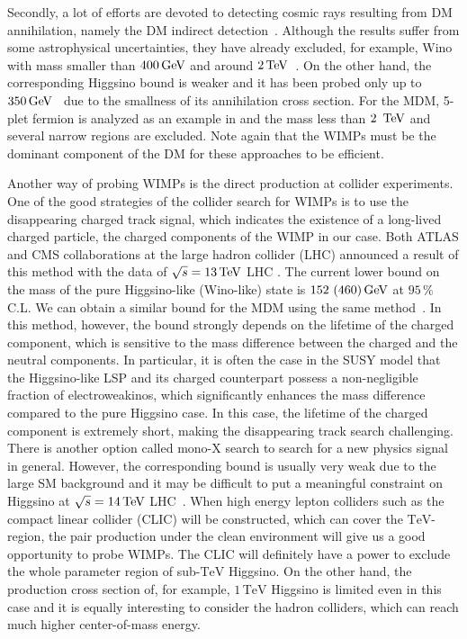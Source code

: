 \documentclass[12pt,twoside,book]{article}
\begin{document}
Secondly, a lot of efforts are devoted to detecting cosmic rays resulting from DM annihilation, namely the DM indirect detection~\cite{Fermi-LAT:2016uux, Ahnen:2016qkx, Abdallah:2016ygi, Gomez-Vargas:2013bea}.
Although the results suffer from some astrophysical uncertainties, they have already excluded, for example, Wino with mass smaller than $400\,{\rm GeV}$ and around $2\,{\rm TeV}$~\cite{Bhattacherjee:2014dya}.
On the other hand, the corresponding Higgsino bound is weaker and it has been probed only up to $350\,{\rm GeV}$~\cite{Krall:2017xij} due to the smallness of its annihilation cross section.
For the MDM, 5-plet fermion is analyzed as an example in \cite{Abdalla:2018mve} and the mass less than $2\,~{\rm TeV}$ and several narrow regions are excluded.
Note again that the WIMPs must be the dominant component of the DM for these approaches to be efficient.

Another way of probing WIMPs is the direct production at collider experiments.
One of the good strategies of the collider search for WIMPs is to use the disappearing charged track signal, which indicates the existence of a long-lived charged particle, the charged components of the WIMP in our case.
Both ATLAS and CMS collaborations at the large hadron collider (LHC) announced a result of this method with the data of $\sqrt{s} = 13\,{\rm TeV}$ LHC \cite{Aaboud:2017mpt, ATL-PHYS-PUB-2017-019, Sirunyan:2018ldc}.
The current lower bound on the mass of the pure Higgsino-like (Wino-like) state is $152~(460)\,{\rm GeV}$ at $95\,\%$ C.L.
We can obtain a similar bound for the MDM using the same method~\cite{Ostdiek:2015aga}.
In this method, however, the bound strongly depends on the lifetime of the charged component, which is sensitive to the mass difference between the charged and the neutral components.
In particular, it is often the case in the SUSY model that the Higgsino-like LSP and its charged counterpart possess a non-negligible fraction of electroweakinos, which significantly enhances the mass difference compared to the pure Higgsino case.
In this case, the lifetime of the charged component is extremely short, making the disappearing track search challenging.
There is another option called mono-X search to search for a new physics signal in general.
However, the corresponding bound is usually very weak due to the large SM background and it may be difficult to put a meaningful constraint on Higgsino at $\sqrt{s} = 14\,{\rm TeV}$ LHC~\cite{Baer:2014cua}.
When high energy lepton colliders such as the compact linear collider (CLIC) \cite{Charles:2018vfv} will be constructed, which can cover the $\mathrm{TeV}$-region, the pair production under the clean environment will give us a good opportunity to probe WIMPs.
The CLIC will definitely have a power to exclude the whole parameter region of sub-$\mathrm{TeV}$ Higgsino.
On the other hand, the production cross section of, for example, $1\,\mathrm{TeV}$ Higgsino is limited even in this case and it is equally interesting to consider the hadron colliders, which can reach much higher center-of-mass energy.
\end{document}
